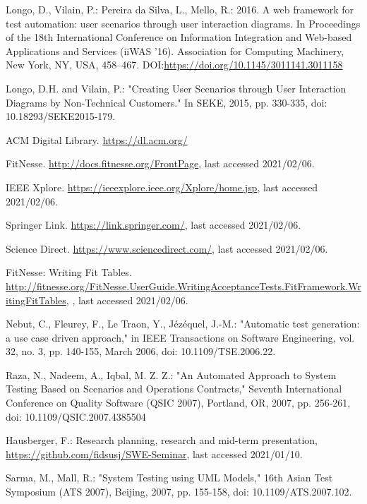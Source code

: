 \documentclass[a4paper,10pt, bibliography=totocnumbered]{scrreprt}
\begin{document}
\begin{thebibliography}{9}
 Longo, D., Vilain, P.: Pereira da Silva, L., Mello, R.: 2016. A web framework for test automation: user scenarios through user interaction diagrams. In Proceedings of the 18th International Conference on Information Integration and Web-based Applications and Services (iiWAS '16). Association for Computing Machinery, New York, NY, USA, 458–467. DOI:\url{https://doi.org/10.1145/3011141.3011158}

 Longo, D.H. and Vilain, P.: "Creating User Scenarios through User Interaction Diagrams by Non-Technical Customers." In SEKE, 2015, pp. 330-335, doi: 10.18293/SEKE2015-179.

 ACM Digital Library. \url{https://dl.acm.org/} 

 FitNesse. \url{http://docs.fitnesse.org/FrontPage}, last accessed 2021/02/06.

 IEEE Xplore. \url{https://ieeexplore.ieee.org/Xplore/home.jsp}, last accessed 2021/02/06.

 Springer Link. \url{https://link.springer.com/}, last accessed 2021/02/06.

 Science Direct. \url{https://www.sciencedirect.com/}, last accessed 2021/02/06.

 FitNesse: Writing Fit Tables. \url{http://fitnesse.org/FitNesse.UserGuide.WritingAcceptanceTests.FitFramework.WritingFitTables}, , last accessed 2021/02/06.


 Nebut, C., Fleurey, F., Le Traon, Y., Jézéquel, J.-M.: "Automatic test generation: a use case driven approach," in IEEE Transactions on Software Engineering, vol. 32, no. 3, pp. 140-155, March 2006, doi: 10.1109/TSE.2006.22.

 Raza, N., Nadeem, A., Iqbal, M. Z. Z.: "An Automated Approach to System Testing Based on Scenarios and Operations Contracts," Seventh International Conference on Quality Software (QSIC 2007), Portland, OR, 2007, pp. 256-261, doi: 10.1109/QSIC.2007.4385504

 Hausberger, F.: Research planning, research and mid-term presentation, \url{https://github.com/fidsusj/SWE-Seminar}, last accessed 2021/01/10.

 Sarma, M., Mall, R.: "System Testing using UML Models," 16th Asian Test Symposium (ATS 2007), Beijing, 2007, pp. 155-158, doi: 10.1109/ATS.2007.102.


\end{thebibliography}
\end{document}
